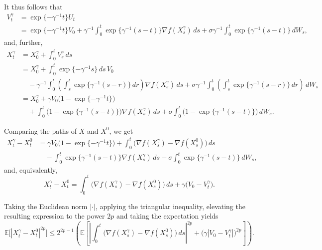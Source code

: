 \documentclass[11pt]{article}
\theoremstyle{remark}
\begin{document}
It thus follows that
\begin{equation}
\label{eq:3.9}
\begin{aligned}
V_t^{\gamma} &= \exp\{-\gamma^{-1}t\}U_t \\
&= \exp\{-\gamma^{-1}t\}V_0+\gamma^{-1}\int_0^t \exp\{\gamma^{-1}(s-t)\}\nabla f(X_s^{\gamma})\,ds+\sigma\gamma^{-1}\int_0^t \exp\{\gamma^{-1}(s-t)\}\,dW_s,
\end{aligned}
\end{equation}
and, further,
\[
\begin{aligned}
X_t^{\gamma} &= X_0^{\gamma}+\int_0^t V_s^{\gamma}\,ds \\
&= X_0^{\gamma}+\int_0^t \exp\{-\gamma^{-1}s\}\,ds\,V_0 \\
&\quad -\gamma^{-1}\int_0^t \left(\int_s^t \exp\{\gamma^{-1}(s-r)\}\,dr\right)\nabla f(X_s^{\gamma})\,ds+\sigma\gamma^{-1}\int_0^t \left(\int_s^t \exp\{\gamma^{-1}(s-r)\}\,dr\right)\,dW_s \\
&= X_0^{\gamma}+\gamma V_0\bigl(1-\exp\{-\gamma^{-1}t\}\bigr) \\
&\quad +\int_0^t \bigl(1-\exp\{\gamma^{-1}(s-t)\}\bigr)\nabla f(X_s^{\gamma})\,ds+\sigma\int_0^t \bigl(1-\exp\{\gamma^{-1}(s-t)\}\bigr)\,dW_s.
\end{aligned}
\]

Comparing the paths of $X$ and $X^0$, we get
\begin{equation}
\label{eq:3.10}
\begin{aligned}
X_t^{\gamma}-X_t^0
&= \gamma V_0\bigl(1-\exp\{-\gamma^{-1}t\}\bigr)+\int_0^t \bigl(\nabla f(X_s^{\gamma})-\nabla f(X_s^0)\bigr)\,ds \\
&\quad -\int_0^t \exp\{\gamma^{-1}(s-t)\}\nabla f(X_s^{\gamma})\,ds-\sigma\int_0^t \exp\{\gamma^{-1}(s-t)\}\,dW_s,
\end{aligned}
\end{equation}
and, equivalently,
\[
X_t^{\gamma}-X_t^0=\int_0^t \bigl(\nabla f(X_s^{\gamma})-\nabla f(X_s^0)\bigr)\,ds+\gamma\bigl(V_0-V_t^{\gamma}\bigr).
\]

Taking the Euclidean norm $|\cdot|$, applying the triangular inequality, elevating the resulting expression to the power $2p$ and taking the expectation yields
\begin{equation}
\label{eq:3.11}
\mathbb{E}\bigl[|X_t^{\gamma}-X_t^0|^{2p}\bigr]\le 2^{2p-1}\left(\mathbb{E}\left[\left|\int_0^t \bigl(\nabla f(X_s^{\gamma})-\nabla f(X_s^0)\bigr)\,ds\right|^{2p}+\bigl(\gamma|V_0-V_t^{\gamma}|\bigr)^{2p}\right]\right).
\end{equation}
\end{document}
